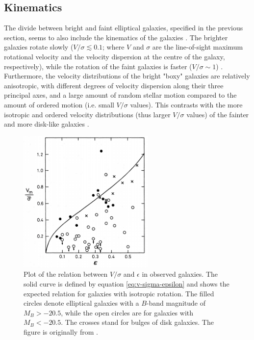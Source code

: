 \documentclass[english, oneside]{HYgradu}
\begin{document}
\subsection{Kinematics} \label{section:ellip_kinematics}

The divide between bright and faint elliptical galaxies, specified in the previous section, seems to also include the kinematics of the galaxies \citep[discussed in e.g.][]{GalaxyFormationAndEvo2010}. The brighter galaxies rotate slowly ($V/\sigma \lesssim 0.1$; where $V$ and $\sigma$ are the line-of-sight maximum rotational velocity and the velocity dispersion at the centre of the galaxy, respectively), while the rotation of the faint galaxies is faster ($V/\sigma \sim 1$) \citep{Davies1983, Cappellari2007}. Furthermore, the velocity distributions of the bright "boxy" galaxies are relatively anisotropic, with different degrees of velocity dispersion along their three principal axes, and a large amount of random stellar motion compared to the amount of ordered motion (i.e. small $V/\sigma$ values). This contrasts with the more isotropic and ordered velocity distributions (thus larger $V/\sigma$ values) of the fainter and more disk-like galaxies \citep{Kormendy2009, Krajnovic2008}. 

\begin{figure}[h]
	\centering
	\includegraphics[width=0.60\textwidth]{davies_v-sigma.png}
	\caption{Plot of the relation between $V/\sigma$ and $\epsilon$ in observed galaxies. The solid curve is defined by equation \ref{eq:v-sigma-epsilon} and shows the expected relation for galaxies with isotropic rotation. The filled circles denote elliptical galaxies with a $B$-band magnitude of $M_B > -20.5$, while the open circles are for galaxies with $M_B < -20.5$. The crosses stand for bulges of disk galaxies. The figure is originally from \cite{Davies1983}.}
	\label{figure:v-sigma}
\end{figure}
\end{document}
